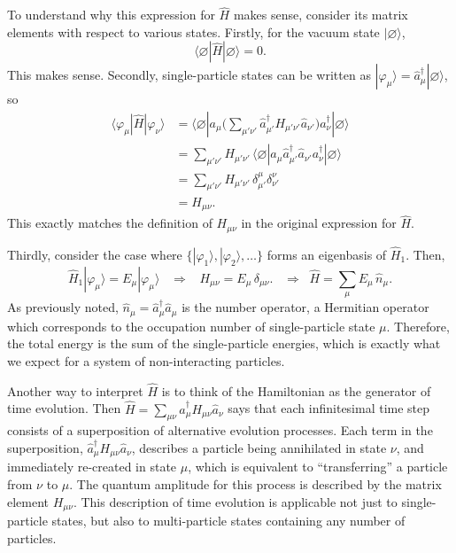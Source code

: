 \documentclass[pra,12pt]{revtex4}
\begin{document}
To understand why this expression for $\hat{H}$ makes sense, consider
its matrix elements with respect to various states.  Firstly, for the
vacuum state $|\varnothing\rangle$,
\begin{equation}
  \langle\varnothing|\hat{H}|\varnothing\rangle = 0.
\end{equation}
This makes sense. Secondly, single-particle states can be written as
$|\varphi_\mu\rangle = \hat{a}^\dagger_\mu|\varnothing\rangle$, so
\begin{equation}
  \begin{aligned}\langle\varphi_\mu|\hat{H}|\varphi_\nu\rangle &= \langle\varnothing|a_\mu \Big(\sum_{\mu'\nu'} \hat{a}^\dagger_{\mu'} H_{\mu'\nu'} \hat{a}_{\nu'}\Big) a_\nu^\dagger |\varnothing\rangle \\ &= \sum_{\mu'\nu'} H_{\mu'\nu'} \, \langle\varnothing|a_\mu \hat{a}^\dagger_{\mu'}  \hat{a}_{\nu'} a_\nu^\dagger |\varnothing\rangle \\ &= \sum_{\mu'\nu'} H_{\mu'\nu'} \, \delta^{\mu}_{\mu'} \delta^{\nu}_{\nu'} \\&= H_{\mu\nu}.\end{aligned}
\end{equation}
This exactly matches the definition of $H_{\mu\nu}$ in the original
expression for $\hat{H}$.

Thirdly, consider the case where
$\{|\varphi_1\rangle,|\varphi_2\rangle,\dots\}$ forms an eigenbasis of
$\hat{H}_1$.  Then,
\begin{equation}
  \hat{H}_1|\varphi_\mu\rangle = E_\mu |\varphi_\mu\rangle \;\;\;\Rightarrow\;\;\; H_{\mu\nu} = E_\mu\,\delta_{\mu\nu}. \;\;\;\Rightarrow \;\; \hat{H} = \sum_{\mu} E_\mu \,\hat{n}_\mu.
\end{equation}
As previously noted, $\hat{n}_\mu = \hat{a}^\dagger_\mu \hat{a}_\mu$
is the number operator, a Hermitian operator which corresponds to the
occupation number of single-particle state $\mu$.  Therefore, the
total energy is the sum of the single-particle energies, which is
exactly what we expect for a system of non-interacting particles.

Another way to interpret $\hat{H}$ is to think of the Hamiltonian as
the generator of time evolution.  Then $\hat{H} = \sum_{\mu\nu}
\hat{a}^\dagger_\mu H_{\mu\nu} \hat{a}_\nu$ says that each
infinitesimal time step consists of a superposition of alternative
evolution processes.  Each term in the superposition,
$\hat{a}^\dagger_\mu H_{\mu\nu} \hat{a}_\nu$, describes a particle
being annihilated in state $\nu$, and immediately re-created in state
$\mu$, which is equivalent to ``transferring'' a particle from $\nu$
to $\mu$.  The quantum amplitude for this process is described by the
matrix element $H_{\mu\nu}$.  This description of time evolution is
applicable not just to single-particle states, but also to
multi-particle states containing any number of particles.
\end{document}
